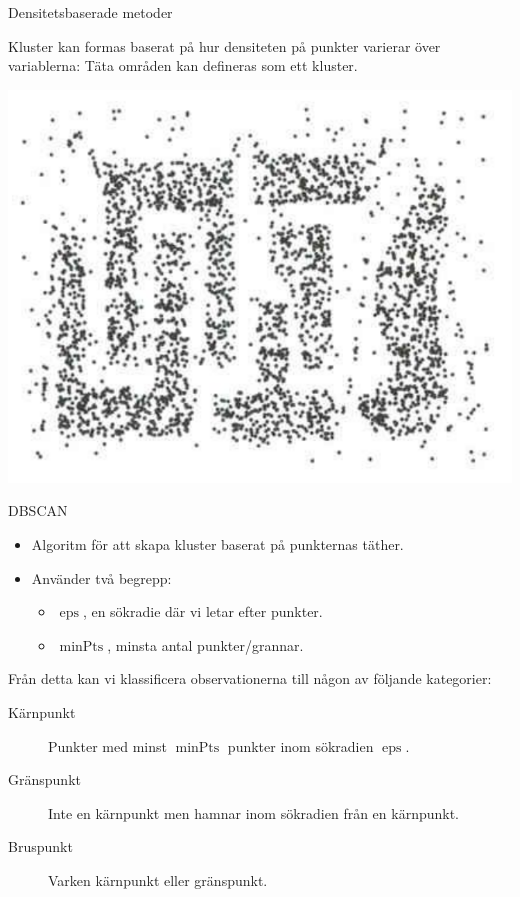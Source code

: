 \documentclass[10pt,english]{beamer}
\begin{document}
\begin{frame}{Densitetsbaserade metoder}

    Kluster kan formas baserat på hur densiteten på punkter varierar över variablerna: Täta områden kan defineras som ett kluster.

    \includegraphics[width = .8\textwidth]{figs/density_cluster2.png}
    
\end{frame}

\begin{frame}{DBSCAN}

    \begin{itemize}
        \item Algoritm för att skapa kluster baserat på punkternas täther.
        \item Använder två begrepp:
        \begin{itemize}
            \item $\operatorname{eps}$, en sökradie där vi letar efter punkter.
            \item $\operatorname{minPts}$, minsta antal punkter/grannar.
        \end{itemize}
    \end{itemize}
    
    Från detta kan vi klassificera observationerna till någon av följande kategorier:
    \begin{description}
        \item[Kärnpunkt] Punkter med minst $\operatorname{minPts}$ punkter inom sökradien $\operatorname{eps}$.
        \item[Gränspunkt] Inte en kärnpunkt men hamnar inom sökradien från en kärnpunkt.
        \item[Bruspunkt] Varken kärnpunkt eller gränspunkt.   
    \end{description}

\end{frame}
\end{document}
